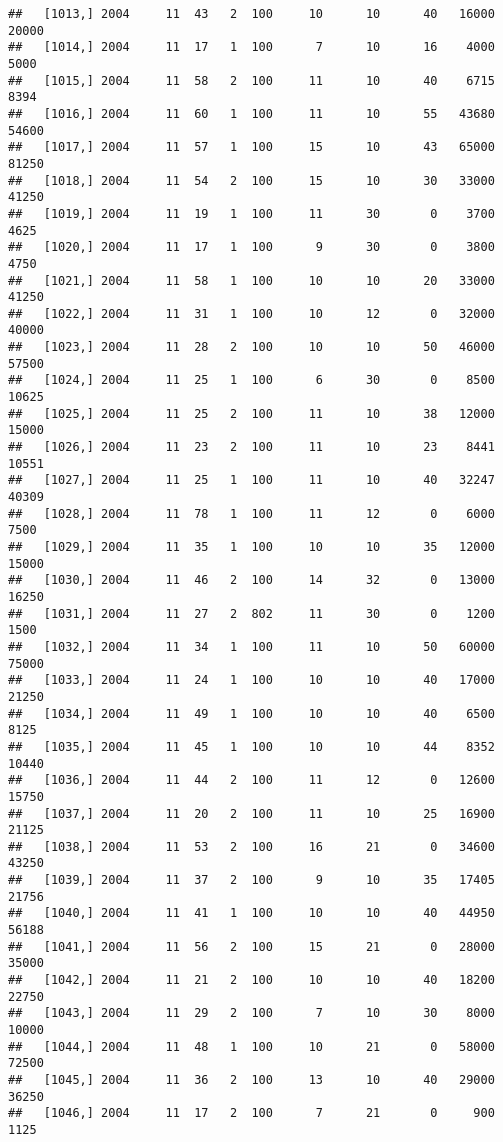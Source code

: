 \documentclass{article}\usepackage[]{graphicx}\usepackage[]{color}
\makeatletter
\newenvironment{kframe}{%
 \def\at@end@of@kframe{}%
 \ifinner\ifhmode%
  \def\at@end@of@kframe{\end{minipage}}%
  \begin{minipage}{\columnwidth}%
 \fi\fi%
 \def\FrameCommand##1{\hskip\@totalleftmargin \hskip-\fboxsep
 \colorbox{shadecolor}{##1}\hskip-\fboxsep
     \hskip-\linewidth \hskip-\@totalleftmargin \hskip\columnwidth}%
 \MakeFramed {\advance\hsize-\width
   \@totalleftmargin\z@ \linewidth\hsize
   \@setminipage}}%
 {\par\unskip\endMakeFramed%
 \at@end@of@kframe}
\newenvironment{knitrout}{}{} %
\makeatother
\begin{document}
\begin{knitrout}
\begin{kframe}
\begin{verbatim}
##   [1013,] 2004     11  43   2  100     10      10      40   16000   20000
##   [1014,] 2004     11  17   1  100      7      10      16    4000    5000
##   [1015,] 2004     11  58   2  100     11      10      40    6715    8394
##   [1016,] 2004     11  60   1  100     11      10      55   43680   54600
##   [1017,] 2004     11  57   1  100     15      10      43   65000   81250
##   [1018,] 2004     11  54   2  100     15      10      30   33000   41250
##   [1019,] 2004     11  19   1  100     11      30       0    3700    4625
##   [1020,] 2004     11  17   1  100      9      30       0    3800    4750
##   [1021,] 2004     11  58   1  100     10      10      20   33000   41250
##   [1022,] 2004     11  31   1  100     10      12       0   32000   40000
##   [1023,] 2004     11  28   2  100     10      10      50   46000   57500
##   [1024,] 2004     11  25   1  100      6      30       0    8500   10625
##   [1025,] 2004     11  25   2  100     11      10      38   12000   15000
##   [1026,] 2004     11  23   2  100     11      10      23    8441   10551
##   [1027,] 2004     11  25   1  100     11      10      40   32247   40309
##   [1028,] 2004     11  78   1  100     11      12       0    6000    7500
##   [1029,] 2004     11  35   1  100     10      10      35   12000   15000
##   [1030,] 2004     11  46   2  100     14      32       0   13000   16250
##   [1031,] 2004     11  27   2  802     11      30       0    1200    1500
##   [1032,] 2004     11  34   1  100     11      10      50   60000   75000
##   [1033,] 2004     11  24   1  100     10      10      40   17000   21250
##   [1034,] 2004     11  49   1  100     10      10      40    6500    8125
##   [1035,] 2004     11  45   1  100     10      10      44    8352   10440
##   [1036,] 2004     11  44   2  100     11      12       0   12600   15750
##   [1037,] 2004     11  20   2  100     11      10      25   16900   21125
##   [1038,] 2004     11  53   2  100     16      21       0   34600   43250
##   [1039,] 2004     11  37   2  100      9      10      35   17405   21756
##   [1040,] 2004     11  41   1  100     10      10      40   44950   56188
##   [1041,] 2004     11  56   2  100     15      21       0   28000   35000
##   [1042,] 2004     11  21   2  100     10      10      40   18200   22750
##   [1043,] 2004     11  29   2  100      7      10      30    8000   10000
##   [1044,] 2004     11  48   1  100     10      21       0   58000   72500
##   [1045,] 2004     11  36   2  100     13      10      40   29000   36250
##   [1046,] 2004     11  17   2  100      7      21       0     900    1125

\end{verbatim}
\end{kframe}
\end{knitrout}
\end{document}
